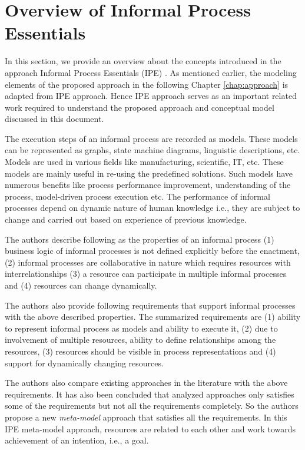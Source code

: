 \section{Overview of Informal Process Essentials}
\label{sec:basicconcepts}
In this section, we provide an overview about the concepts introduced in the approach Informal Process Essentials (IPE) \cite{Sungur2014a}. As mentioned earlier, the modeling elements of the proposed approach in the following Chapter \ref{chap:approach} is adapted from IPE approach. Hence IPE approach serves as an important related work required to understand the proposed approach and conceptual model discussed in this document. 

The execution steps of an informal process are recorded as models. These models can be represented as graphs, state machine diagrams, linguistic descriptions, etc. Models are used in various fields like manufacturing, scientific, IT, etc. These models are mainly useful in re-using the predefined solutions. Such models have numerous benefits \cite{Indulska2009} like process performance improvement, understanding of the process, model-driven process execution etc. The performance of informal processes depend on dynamic nature of human knowledge i.e., they are subject to change and carried out based on experience of previous knowledge. 

The authors describe following as the properties of an informal process (1) business logic of informal processes is not defined explicitly before the enactment, (2) informal processes are collaborative in nature which requires resources with interrelationships (3) a resource can participate in multiple informal processes and (4) resources can change dynamically.

The authors also provide following requirements that support informal processes with the above described properties. The summarized requirements are (1) ability to represent informal process as models and ability to execute it, (2) due to involvement of multiple resources, ability to define relationships among the resources, (3) resources should be visible in process representations and (4) support for dynamically changing resources. 

The authors also compare existing approaches in the literature with the above requirements. It has also been concluded that analyzed approaches only satisfies some of the requirements but not all the requirements completely. So the authors propose a new \textit{meta-model} approach that satisfies all the requirements. In this IPE meta-model approach, resources are related to each other and work towards achievement of an intention, i.e., a goal.   

